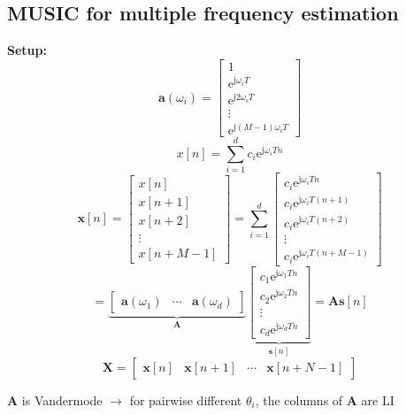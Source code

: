 \documentclass[english]{latex4ei/latex4ei_sheet}
\begin{document}
\begin{sectionbox}
  \subsection{MUSIC for multiple frequency estimation}
  \textbf{Setup:}
  $$\boldsymbol{a}\left(\omega_{i}\right)=\left[\begin{array}{c}
    1 \\
    \mathrm{e}^{\mathrm{j} \omega_{i} T} \\
    \mathrm{e}^{\mathrm{j} 2 \omega_{i} T} \\
    \vdots \\
    \mathrm{e}^{\mathrm{j}(M-1) \omega_{i} T}
    \end{array}\right]$$
  $$x[n]=\sum_{i=1}^{d} c_{i} \mathrm{e}^{\mathrm{j} \omega_{i} T n}$$
  $$\boldsymbol{x}[n]=\left[\begin{array}{c}
    x[n] \\
    x[n+1] \\
    x[n+2] \\
    \vdots \\
    x[n+M-1]
    \end{array}\right]=\sum_{i=1}^{d}\left[\begin{array}{c}
    c_{i} \mathrm{e}^{\mathrm{j} \omega_{i} T n} \\
    c_{i} \mathrm{e}^{\mathrm{j} \omega_{i} T(n+1)} \\
    c_{i} \mathrm{e}^{\mathrm{j} \omega_{i} T(n+2)} \\
    \vdots \\
    c_{i} \mathrm{e}^{\mathrm{j} \omega_{i} T(n+M-1)}
    \end{array}\right]$$
  $$=\underbrace{\left[\begin{array}{lll}
    \boldsymbol{a}\left(\omega_{1}\right)  & \cdots & \boldsymbol{a}\left(\omega_{d}\right)
    \end{array}\right]}_{\boldsymbol{A}} \underbrace{\left[\begin{array}{c}
    c_{1} \mathrm{e}^{\mathrm{j} \omega_{1} T n} \\
    c_{2} \mathrm{e}^{\mathrm{j} \omega_{2} T n} \\
    \vdots \\
    c_{d} \mathrm{e}^{\mathrm{j} \omega_{d} T n}
    \end{array}\right]}_{\boldsymbol{s}[n]}=\boldsymbol{A} \boldsymbol{s}[n]$$
  $$\boldsymbol{X}=\left[\begin{array}{llll}
    \boldsymbol{x}[n] & \boldsymbol{x}[n+1] & \cdots & \boldsymbol{x}[n+N-1]
    \end{array}\right]$$

  $\boldsymbol{A}$ is Vandermode  $\rightarrow$ for pairwise different $\theta_i$, the columns of $\boldsymbol{A}$ are LI

\end{sectionbox}
\end{document}
